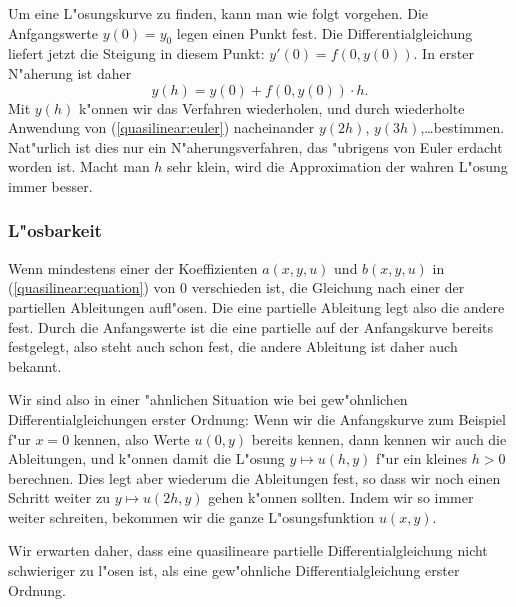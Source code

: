 Um eine L"osungskurve zu finden, kann man wie folgt vorgehen.
Die Anfgangswerte  $y(0)=y_0$ legen einen Punkt fest.
Die Differentialgleichung liefert jetzt die Steigung in
diesem Punkt: $y'(0)=f(0,y(0))$.
In erster N"aherung ist daher
\begin{equation}
y(h)=y(0)+f(0,y(0))\cdot h.
\label{quasilinear:euler}
\end{equation}
Mit $y(h)$ k"onnen wir das Verfahren wiederholen, und durch
wiederholte Anwendung von (\ref{quasilinear:euler})
nacheinander $y(2h)$, $y(3h)$,\dots bestimmen.
Nat"urlich ist dies nur ein N"aherungsverfahren, das "ubrigens
von Euler erdacht worden ist. Macht man $h$ sehr klein, wird
die Approximation der wahren L"osung immer besser.

\subsubsection{L"osbarkeit}
Wenn mindestens einer der Koeffizienten
$a(x,y,u)$ und $b(x,y,u)$ in (\ref{quasilinear:equation})
von $0$ verschieden ist, die Gleichung
nach einer der partiellen Ableitungen aufl"osen.
Die eine partielle Ableitung legt also die andere fest.
Durch die Anfangswerte ist die eine partielle auf der
Anfangskurve bereits festgelegt, also steht auch schon fest,
die andere Ableitung ist daher auch bekannt. 

Wir sind also in einer "ahnlichen Situation wie bei gew"ohnlichen
Differentialgleichungen erster Ordnung: Wenn wir die 
Anfangskurve zum Beispiel f"ur $x=0$ kennen, also Werte
$u(0,y)$ bereits kennen, dann kennen wir
auch die Ableitungen, und k"onnen damit die L"osung
$y\mapsto u(h, y)$ f"ur ein kleines $h>0$ berechnen. Dies legt aber
wiederum die Ableitungen fest, so dass wir noch einen Schritt 
weiter zu $y\mapsto u(2h,y)$ gehen k"onnen sollten.
Indem wir so immer weiter schreiten, bekommen wir die ganze
L"osungsfunktion $u(x,y)$.

Wir erwarten daher, dass eine quasilineare partielle Differentialgleichung
nicht schwieriger zu l"osen ist, als eine gew"ohnliche Differentialgleichung
erster Ordnung.


